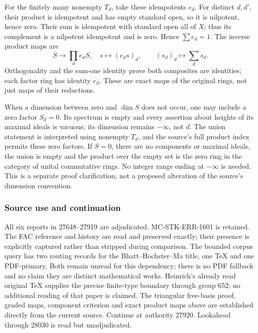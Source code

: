 For the finitely many nonempty \(T_d\), take these idempotents \(e_d\). For distinct \(d,d'\), their product is idempotent and has empty standard open, so it is nilpotent, hence zero. Their sum is idempotent with standard open all of \(X\); thus its complement is a nilpotent idempotent and is zero. Hence \(\sum e_d=1\). The inverse product maps are \[
 S\longrightarrow\prod_d e_dS,\quad s\longmapsto(e_ds)_d,
 \qquad (s_d)_d\longmapsto\sum_d s_d.
\] Orthogonality and the sum-one identity prove both composites are identities; each factor ring has identity \(e_d\). These are exact maps of the original rings, not just maps of their reductions.

When a dimension between zero and \(\dim S\) does not occur, one may include a zero factor \(S_d=0\). Its spectrum is empty and every assertion about heights of its maximal ideals is vacuous; its dimension remains \(-\infty\), not \(d\). The union statement is interpreted using nonempty \(T_d\), and the source's full product index permits these zero factors. If \(S=0\), there are no components or maximal ideals, the union is empty and the product over the empty set is the zero ring in the category of unital commutative rings. No integer range ending at \(-\infty\) is needed. This is a separate proof clarification, not a proposed alteration of the source's dimension convention.

\subsubsection{Source use and continuation}\label{source-use-and-continuation}

All six reports in 27648--27919 are adjudicated. MC-STK-ERR-1601 is retained. The FAC reference and history are read and preserved exactly; their presence is explicitly captured rather than stripped during comparison. The bounded corpus query has two routing records for the Bhatt--Hochster--Ma title, one TeX and one PDF-primary. Both remain unread for this dependency; there is no PDF fallback and no claim they are distinct mathematical works. Heinrich's already read original TeX supplies the precise finite-type boundary through group 652; no additional reading of that paper is claimed. The triangular free-basis proof, graded maps, component criterion and exact product maps above are established directly from the current source. Continue at authority 27920. Lookahead through 28030 is read but unadjudicated.

